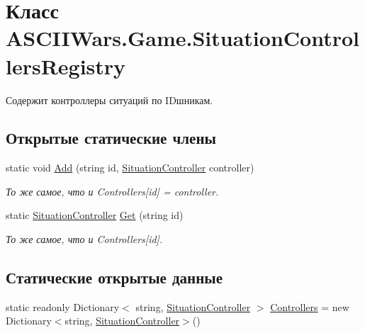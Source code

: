 \hypertarget{class_a_s_c_i_i_wars_1_1_game_1_1_situation_controllers_registry}{}\section{Класс A\+S\+C\+I\+I\+Wars.\+Game.\+Situation\+Controllers\+Registry}
\label{class_a_s_c_i_i_wars_1_1_game_1_1_situation_controllers_registry}


Содержит контроллеры ситуаций по ID\textquotesingle{}шникам.  


\subsection*{Открытые статические члены}
\begin{DoxyCompactItemize}
\item 
static void \hyperlink{class_a_s_c_i_i_wars_1_1_game_1_1_situation_controllers_registry_a6b66911781c68cab75889451cd3b6644}{Add} (string id, \hyperlink{interface_a_s_c_i_i_wars_1_1_game_1_1_situation_controller}{Situation\+Controller} controller)
\begin{DoxyCompactList}\small\item\em То же самое, что и {\ttfamily Controllers\mbox{[}id\mbox{]} = controller}. \end{DoxyCompactList}\item 
static \hyperlink{interface_a_s_c_i_i_wars_1_1_game_1_1_situation_controller}{Situation\+Controller} \hyperlink{class_a_s_c_i_i_wars_1_1_game_1_1_situation_controllers_registry_a11452e55e8852e375d27f2637ab7d743}{Get} (string id)
\begin{DoxyCompactList}\small\item\em То же самое, что и {\ttfamily Controllers\mbox{[}id\mbox{]}}. \end{DoxyCompactList}\end{DoxyCompactItemize}
\subsection*{Статические открытые данные}
\begin{DoxyCompactItemize}
\item 
static readonly Dictionary$<$ string, \hyperlink{interface_a_s_c_i_i_wars_1_1_game_1_1_situation_controller}{Situation\+Controller} $>$ \hyperlink{class_a_s_c_i_i_wars_1_1_game_1_1_situation_controllers_registry_a1fbefd2e6e4140f5d703ffb7367fee20}{Controllers} = new Dictionary$<$string, \hyperlink{interface_a_s_c_i_i_wars_1_1_game_1_1_situation_controller}{Situation\+Controller}$>$()
\end{DoxyCompactItemize}
